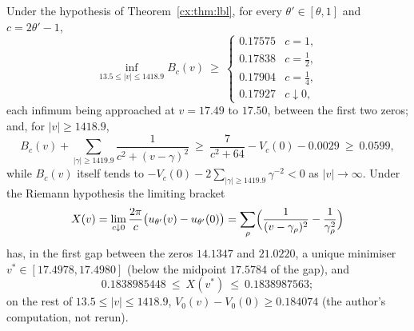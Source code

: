 \begin{proposition}\label{cx:prop:slope}
Under the hypothesis of Theorem~\ref{cx:thm:lbl}, for every $\theta'\in[\theta,1]$ and $c=2\theta'-1$,
\[
\inf_{13.5\le|v|\le1418.9}B_c(v)\ \ge\ \begin{cases}0.17575&c=1,\\0.17838&c=\tfrac12,\\0.17904&c=\tfrac14,\\0.17927&c\downarrow0,\end{cases}
\]
each infimum being approached at $v=17.49$ to $17.50$, between the first two zeros; and, for $|v|\ge1418.9$,
\[
B_c(v)+\sum_{|\gamma|\ge1419.9}\frac1{c^2+(v-\gamma)^2}\ \ge\ \frac7{c^2+64}-V_c(0)-0.0029\ \ge\ 0.0599,
\]
while $B_c(v)$ itself tends to $-V_c(0)-2\sum_{|\gamma|\ge1419.9}\gamma^{-2}<0$ as $|v|\to\infty$. Under the Riemann hypothesis the limiting bracket
\[
X(v)=\lim_{c\downarrow0}\frac{2\pi}c\bigl(u_{\theta'}(v)-u_{\theta'}(0)\bigr)=\sum_\rho\Bigl(\frac1{(v-\gamma_\rho)^2}-\frac1{\gamma_\rho^2}\Bigr)
\]
has, in the first gap between the zeros $14.1347$ and $21.0220$, a unique minimiser $v^*\in[17.4978,17.4980]$ (below the midpoint $17.5784$ of the gap), and
\[
0.1838985448\ \le\ X(v^*)\ \le\ 0.1838987563 ;
\]
on the rest of $13.5\le|v|\le1418.9$, $V_0(v)-V_0(0)\ge0.184074$ (the author's computation, not rerun).
\end{proposition}

